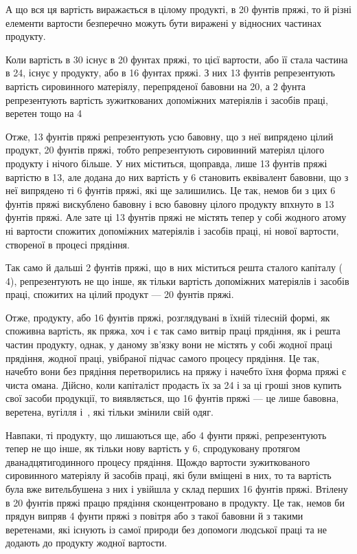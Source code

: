 
А що вся ця вартість виражається в цілому продукті, в 20 фунтів
пряжі, то й різні елементи вартости безперечно можуть бути
виражені у відносних частинах продукту.

Коли вартість в 30 існує в 20 фунтах пряжі, то  цієї вартости, або її стала частина в
24, існує у  продукту, або в 16 фунтах пряжі. З них 13 фунтів репрезентують вартість
сировинного матеріялу, перепряденої бавовни на 20, а 2 фунта репрезентують вартість
зужиткованих допоміжних матеріялів і засобів праці, веретен тощо на 4

Отже, 13 фунтів пряжі репрезентують усю бавовну, що з неї випрядено цілий продукт, 20 фунтів
пряжі, тобто репрезентують сировинний матеріял цілого продукту і нічого більше. У них міститься,
щоправда, лише 13 фунтів пряжі вартістю в 13, але додана до них вартість у 6 становить еквівалент бавовни, що з неї випрядено ті 6 фунтів пряжі, які ще залишились.
Це так, немов би з цих 6 фунтів пряжі вискублено бавовну і всю бавовну цілого продукту впхнуто в
13 фунтів пряжі. Але зате ці 13 фунтів пряжі не містять тепер у собі жодного атому ні
вартости спожитих допоміжних матеріялів і засобів праці, ні нової вартости, створеної в процесі
прядіння.

Так само й дальші 2 фунтів пряжі, що в них міститься решта сталого капіталу (\deq{} 4),
репрезентують не що інше, як
тільки вартість допоміжних матеріялів і засобів праці, спожитих на цілий продукт — 20 фунтів пряжі.

Отже,  продукту, або 16 фунтів пряжі, розглядувані в їхній тілесній формі, як споживна вартість,
як пряжа, хоч і
є так само витвір праці прядіння, як і решта частин продукту, однак, у даному зв’язку вони не
містять у собі жодної праці прядіння, жодної праці, увібраної підчас самого процесу прядіння. Це
так, начебто вони без прядіння перетворились на пряжу і начебто їхня форма пряжі є чиста омана.
Дійсно, коли капіталіст продасть їх за 24 і за ці гроші знов купить свої засоби продукції,
то виявляється, що 16 фунтів пряжі — це лише бавовна, веретена, вугілля і~, які тільки змінили
свій одяг.

Навпаки, ті  продукту, що лишаються ще, або 4 фунти пряжі, репрезентують тепер не що інше, як
тільки нову вартість
у 6, спродуковану протягом дванадцятигодинного процесу прядіння. Щождо вартости
зужиткованого сировинного матеріялу й засобів праці, які були вміщені в них, то та вартість була вже
вительбушена з них і увійшла у склад перших 16 фунтів пряжі. Втілену в 20 фунтів пряжі працю
прядіння сконцентровано
в  продукту. Це так, немов би прядун випряв 4 фунти пряжі з повітря або з такої бавовни й з
такими веретенами, які
існують із самої природи без допомоги людської праці та не додають до продукту жодної вартости.
